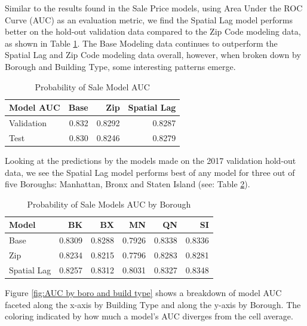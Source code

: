 \documentclass[12pt,]{article}
\begin{document}
Similar to the results found in the Sale Price models, using Area Under
the ROC Curve (AUC) as an evaluation metric, we find the Spatial Lag
model performs better on the hold-out validation data compared to the
Zip Code modeling data, as shown in Table \ref{tab:ProbSaleModelAUC}.
The Base Modeling data continues to outperform the Spatial Lag and Zip
Code modeling data overall, however, when broken down by Borough and
Building Type, some interesting patterns emerge.

\begin{table}

\caption{\label{tab:Prob Model AUC}\label{tab:ProbSaleModelAUC} Probability of Sale Model AUC}
\centering
\begin{tabular}[t]{lrrr}
\toprule
Model AUC & Base & Zip & Spatial Lag\\
\midrule
Validation & 0.832 & 0.8292 & 0.8287\\
Test & 0.830 & 0.8246 & 0.8279\\
\bottomrule
\end{tabular}
\end{table}

Looking at the predictions by the models made on the 2017 validation
hold-out data, we see the Spatial Lag model performs best of any model
for three out of five Boroughs: Manhattan, Bronx and Staten Island (see:
Table \ref{tab:ProbSaleModelAUCbyBoro}).

\begin{table}

\caption{\label{tab:Prob Model AUC by Boro}\label{tab:ProbSaleModelAUCbyBoro} Probability of Sale Models AUC by Borough}
\centering
\begin{tabular}[t]{lrrrrr}
\toprule
Model & BK & BX & MN & QN & SI\\
\midrule
Base & 0.8309 & 0.8288 & 0.7926 & 0.8338 & 0.8336\\
Zip & 0.8234 & 0.8215 & 0.7796 & 0.8283 & 0.8281\\
Spatial Lag & 0.8257 & 0.8312 & 0.8031 & 0.8327 & 0.8348\\
\bottomrule
\end{tabular}
\end{table}

Figure \ref{fig:AUC by boro and build type} shows a breakdown of model
AUC faceted along the x-axis by Building Type and along the y-axis by
Borough. The coloring indicated by how much a model's AUC diverges from
the cell average.
\end{document}
